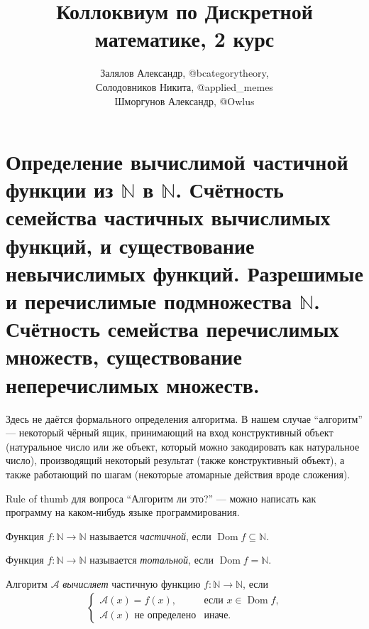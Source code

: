 \documentclass{article}
\title{Коллоквиум по Дискретной математике, 2 курс}
\author{Залялов Александр, @bcategorytheory,\\  Солодовников Никита, @applied\_memes \\ Шморгунов Александр, @Owlus }
\date{}
\begin{document}
\maketitle

    \section{Определение вычислимой частичной функции из $\mathbb{N}$ в $\mathbb{N}$.
    Счётность семейства частичных вычислимых функций, и существование невычислимых функций.
    Разрешимые и перечислимые подмножества $\mathbb{N}$. Счётность семейства перечислимых множеств,
    существование неперечислимых множеств.}

    Здесь не даётся формального определения алгоритма. В нашем случае ``алгоритм'' --- некоторый
    чёрный ящик, принимающий на вход конструктивный объект (натуральное число или же объект, который
    можно закодировать как натуральное число), производящий некоторый результат (также конструктивный
    объект), а также работающий по шагам (некоторые атомарные действия вроде сложения).

    Rule of thumb для вопроса ``Алгоритм ли это?'' --- можно написать как программу на каком-нибудь
    языке программирования.

    \begin{definition}
        Функция $f: \mathbb{N} \to \mathbb{N}$ называется \textit{частичной}, если $\operatorname{Dom} f \subseteq \mathbb{N}$.
    \end{definition}

    \begin{definition}
        Функция $f: \mathbb{N} \to \mathbb{N}$ называется \textit{тотальной}, если $\operatorname{Dom} f = \mathbb{N}.$
    \end{definition}

    \begin{definition}
        Алгоритм $\mathcal{A}$ \textit{вычисляет} частичную функцию $f: \mathbb{N} \to \mathbb{N}$, если
        \begin{gather*}
            \begin{cases}
                \mathcal{A}(x) = f(x), & \text{если $x \in \operatorname{Dom} f$,}\\
                \mathcal{A}(x) \text{ не определено} & \text{иначе.}
            \end{cases}
        \end{gather*}
    \end{definition}
\end{document}
